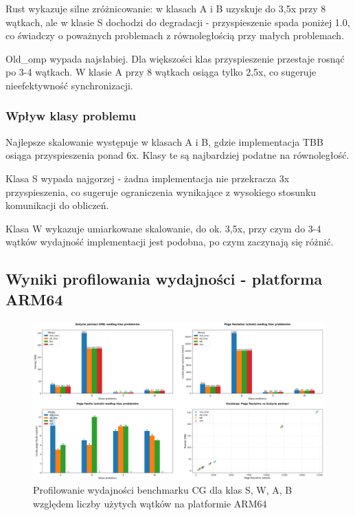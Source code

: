 Rust wykazuje silne zróżnicowanie: w klasach A i B uzyskuje do 3,5x przy 8 wątkach, ale w klasie S dochodzi do degradacji - przyspieszenie spada poniżej 1.0, co świadczy o poważnych problemach z równoległością przy małych problemach.

Old\_omp wypada najsłabiej. Dla większości klas przyspieszenie przestaje rosnąć po 3-4 wątkach. W klasie A przy 8 wątkach osiąga tylko 2,5x, co sugeruje nieefektywność synchronizacji.

\subsubsection{Wpływ klasy problemu}
Najlepsze skalowanie występuje w klasach A i B, gdzie implementacja TBB osiąga przyspieszenia ponad 6x. Klasy te są najbardziej podatne na równoległość.

Klasa S wypada najgorzej - żadna implementacja nie przekracza 3x przyspieszenia, co sugeruje ograniczenia wynikające z wysokiego stosunku komunikacji do obliczeń.

Klasa W wykazuje umiarkowane skalowanie, do ok. 3,5x, przy czym do 3-4 wątków wydajność implementacji jest podobna, po czym zaczynają się różnić.
\subsection{Wyniki profilowania wydajności - platforma ARM64}
\begin{figure}[H]
    \centering
    \includegraphics[width=\textwidth]{analiza/images/parallel/cg/arm/chart_01_memory_comparison.png}
    \caption{Profilowanie wydajności benchmarku CG dla klas S, W, A, B względem liczby użytych wątków na platformie ARM64}
    \label{cg_porownanie_zuzycia_pamieci}
\end{figure}

